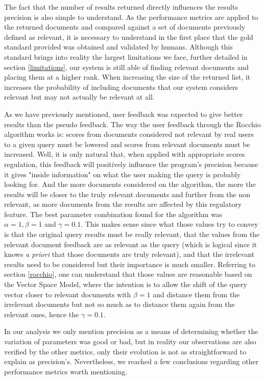 \documentclass[12pt]{article}
\begin{document}
The fact that the number of results returned directly influences the results 
precision is also simple to understand.
As the performance metrics are applied to the returned documents and compared 
against a set of documents previously defined as relevant, it is necessary to 
understand in the first place that the gold standard provided was obtained and 
validated by humans. 
Although this standard brings into reality the largest limitations we face, further 
detailed in section \ref{limitations}, our system is still able of finding relevant 
documents and placing them at a higher rank. 
When increasing the size of the returned list, it increases the probability of 
including documents that our system considers relevant but may not actually be 
relevant at all.

As we have previously mentioned, user feedback was expected to give better results
than the pseudo feedback.
The way the user feedback through the Rocchio algorithm works is: scores from 
documents considered not relevant by real users to a given query must be lowered 
and scores from relevant documents must be increased.
Well, it is only natural that, when applied with appropriate scores regulation,
this feedback will positively influence the program's precision because it gives
"inside information" on what the user making the query is probably looking for.
And the more documents considered on the algorithm, the more the results will 
be closer to the truly relevant documents and further from the non relevant, as 
more documents from the results are affected by this regulatory feature.
The best parameter combination found for the algorithm was $\alpha=1, \beta=1$ and $\gamma=0.1$. 
This makes sense since what those values try to convey is that the original query 
results must be really relevant, that the values from the relevant document 
feedback are as relevant as the query (which is logical since it knows 
\textit{a priori} that those documents are truly relevant), and that the irrelevant 
results need to be considered but their importance is much smaller.
Referring to section \ref{rocchio}, one can understand that those values are 
reasonable based on the Vector Space Model, where the intention is to allow the 
shift of the query vector closer to relevant documents with $\beta=1$ and distance 
them from the irrelevant documents but not so much as to distance them again 
from the relevant ones, hence the $\gamma=0.1$.

In our analysis we only mention precision as a means of determining whether 
the variation of parameters was good or bad, but in reality our observations 
are also verified by the other metrics, only their evolution is not as 
straightforward to explain as precision's.
Nevertheless, we reached a few conclusions regarding other performance metrics
worth mentioning.
\end{document}
